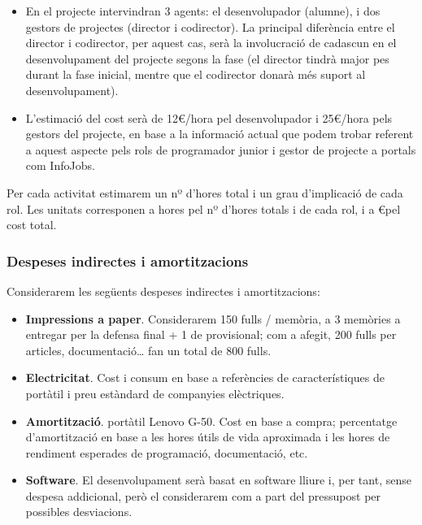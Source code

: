 \begin{itemize}
\item En el projecte intervindran 3 agents: el desenvolupador (alumne), i dos gestors de projectes (director i codirector). La principal diferència entre el director i codirector, per aquest cas, serà la involucració de cadascun en el desenvolupament del projecte segons la fase (el director tindrà major pes durant la fase inicial, mentre que el codirector donarà més suport al desenvolupament).
\item L’estimació del cost serà de 12\euro /hora pel desenvolupador i 25\euro /hora pels gestors del projecte, en base a la informació actual que podem trobar referent a aquest aspecte pels rols de programador junior i gestor de projecte a portals com InfoJobs.
\end{itemize}

Per cada activitat estimarem un nº d’hores total i un grau d’implicació de cada rol. Les unitats corresponen a hores pel nº d’hores totals i de cada rol, i a \euro pel cost total.

\subsubsection{Despeses indirectes i amortitzacions}

Considerarem les següents despeses indirectes i amortitzacions:

\begin{itemize}
\item \textbf{Impressions a paper}. Considerarem 150 fulls / memòria, a 3 memòries a entregar per la defensa final + 1 de provisional; com a afegit, 200 fulls per articles, documentació… fan un total de 800 fulls.
\item \textbf{Electricitat}. Cost i consum en base a referències de característiques de portàtil i preu estàndard de companyies elèctriques.
\item \textbf{Amortització}. portàtil Lenovo G-50. Cost en base a compra; percentatge d’amortització en base a les hores útils de vida aproximada i les hores de rendiment esperades de programació, documentació, etc.
\item \textbf{Software}. El desenvolupament serà basat en software lliure i, per tant, sense despesa addicional, però el considerarem com a part del pressupost per possibles desviacions.
\end{itemize}

